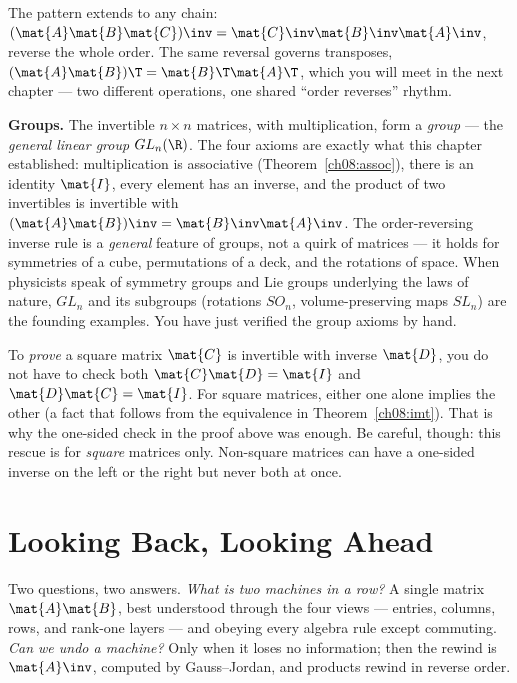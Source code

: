 The pattern extends to any chain: $(\mat{A}\mat{B}\mat{C})\inv = \mat{C}\inv\mat{B}\inv\mat{A}\inv$, reverse the whole order. The same reversal governs transposes,
$(\mat{A}\mat{B})\T = \mat{B}\T\mat{A}\T$, which you will meet in the next chapter ---
two different operations, one shared ``order reverses'' rhythm.

\begin{connectionbox}
\textbf{Groups.} The invertible $n\times n$ matrices, with multiplication, form a
\emph{group} --- the \emph{general linear group} $GL_n(\R)$. The four axioms are exactly
what this chapter established: multiplication is associative (Theorem~\ref{ch08:assoc}),
there is an identity $\mat{I}$, every element has an inverse, and the product of two
invertibles is invertible with $(\mat{A}\mat{B})\inv = \mat{B}\inv\mat{A}\inv$. The
order-reversing inverse rule is a \emph{general} feature of groups, not a quirk of
matrices --- it holds for symmetries of a cube, permutations of a deck, and the
rotations of space. When physicists speak of symmetry groups and Lie groups underlying
the laws of nature, $GL_n$ and its subgroups (rotations $SO_n$, volume-preserving maps
$SL_n$) are the founding examples. You have just verified the group axioms by hand.
\end{connectionbox}

\begin{remark}
To \emph{prove} a square matrix $\mat{C}$ is invertible with inverse $\mat{D}$, you do
not have to check both $\mat{C}\mat{D}=\mat{I}$ and $\mat{D}\mat{C}=\mat{I}$. For square
matrices, either one alone implies the other (a fact that follows from the equivalence in
Theorem~\ref{ch08:imt}). That is why the one-sided check in the proof above was enough.
Be careful, though: this rescue is for \emph{square} matrices only. Non-square matrices
can have a one-sided inverse on the left or the right but never both at once.
\end{remark}

\section*{Looking Back, Looking Ahead}

Two questions, two answers. \emph{What is two machines in a row?} A single matrix
$\mat{A}\mat{B}$, best understood through the four views --- entries, columns, rows, and
rank-one layers --- and obeying every algebra rule except commuting. \emph{Can we undo a
machine?} Only when it loses no information; then the rewind is $\mat{A}\inv$, computed
by Gauss--Jordan, and products rewind in reverse order.

